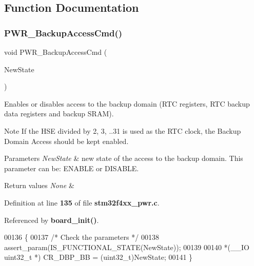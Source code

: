 \subsection{Function Documentation}
\mbox{\label{group__PWR__Group1_ga0741aea35572b1a75f82b74de12df800}} 
\subsubsection{P\+W\+R\+\_\+\+Backup\+Access\+Cmd()}
{\footnotesize\ttfamily void P\+W\+R\+\_\+\+Backup\+Access\+Cmd (\begin{DoxyParamCaption}\item[{\textbf{ Functional\+State}}]{New\+State }\end{DoxyParamCaption})}



Enables or disables access to the backup domain (R\+TC registers, R\+TC backup data registers and backup S\+R\+AM). 

\begin{DoxyNote}{Note}
If the H\+SE divided by 2, 3, ..31 is used as the R\+TC clock, the Backup Domain Access should be kept enabled. 
\end{DoxyNote}

\begin{DoxyParams}{Parameters}
{\em New\+State} & new state of the access to the backup domain. This parameter can be\+: E\+N\+A\+B\+LE or D\+I\+S\+A\+B\+LE. \\
\hline
\end{DoxyParams}

\begin{DoxyRetVals}{Return values}
{\em None} & \\
\hline
\end{DoxyRetVals}


Definition at line \textbf{ 135} of file \textbf{ stm32f4xx\+\_\+pwr.\+c}.



Referenced by \textbf{ board\+\_\+init()}.


\begin{DoxyCode}
00136 \{
00137   \textcolor{comment}{/* Check the parameters */}
00138   assert_param(IS_FUNCTIONAL_STATE(NewState));
00139   
00140   *(\_\_IO uint32\_t *) CR_DBP_BB = (uint32\_t)NewState;
00141 \}
\end{DoxyCode}
\mbox{\label{group__PWR__Group1_gad03a0aac7bc3bc3a9fd012f3769a6990}} 
